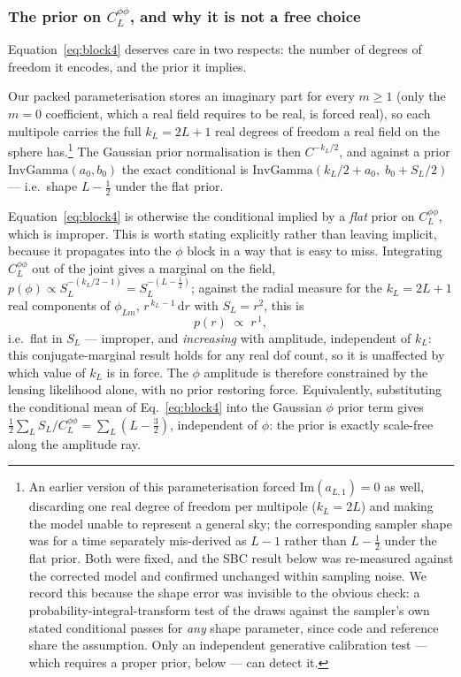 \documentclass[twocolumn,superscriptaddress,aps,prl,floatfix]{revtex4-2}
\newcommand{\clpp}{C_L^{\phi\phi}}
\begin{document}
\subsubsection*{The prior on \texorpdfstring{$\clpp$}{ClPhiPhi}, and why it is
not a free choice}
\label{sec:clpp-prior}

Equation~\eqref{eq:block4} deserves care in two respects: the number of degrees
of freedom it encodes, and the prior it implies.

Our packed parameterisation stores an imaginary part for every $m \ge 1$ (only
the $m=0$ coefficient, which a real field requires to be real, is forced real),
so each multipole carries the full $k_L = 2L+1$ real degrees of freedom a real
field on the sphere has.\footnote{An earlier version of this parameterisation
forced $\mathrm{Im}(a_{L,1}) = 0$ as well, discarding one real degree of
freedom per multipole ($k_L = 2L$) and making the model unable to represent a
general sky; the corresponding sampler shape was for a time separately
mis-derived as $L-1$ rather than $L-\tfrac12$ under the flat prior. Both were
fixed, and the SBC result below was re-measured against the corrected model
and confirmed unchanged within sampling noise. We record this because the
shape error was invisible to the obvious check: a probability-integral-transform
test of the draws against the sampler's own stated conditional passes for
\emph{any} shape parameter, since code and reference share the assumption.
Only an independent generative calibration test --- which requires a proper
prior, below --- can detect it.} The Gaussian prior normalisation is then
$C^{-k_L/2}$, and against a prior $\mathrm{InvGamma}(a_0, b_0)$ the exact
conditional is $\mathrm{InvGamma}(k_L/2 + a_0,\; b_0 + S_L/2)$ --- i.e.\ shape
$L-\tfrac12$ under the flat prior.

Equation~\eqref{eq:block4} is otherwise the conditional implied by a
\emph{flat} prior on $\clpp$, which is improper. This is worth stating explicitly rather than
leaving implicit, because it propagates into the $\phi$ block in a way that is
easy to miss. Integrating $\clpp$ out of the joint gives a marginal on the
field, $p(\phi) \propto S_L^{-(k_L/2 - 1)} = S_L^{-(L-\frac12)}$; against the radial
measure for the $k_L = 2L+1$ real components of $\phi_{Lm}$,
$r^{\,k_L - 1}\,\mathrm{d}r$ with $S_L = r^2$, this is
\begin{equation}
  p(r) \;\propto\; r^{\,1} ,
\end{equation}
i.e.\ flat in $S_L$ --- improper, and \emph{increasing} with amplitude,
independent of $k_L$: this conjugate-marginal result holds for any real dof
count, so it is unaffected by which value of $k_L$ is in force. The
$\phi$ amplitude is therefore constrained by the lensing likelihood alone, with
no prior restoring force. Equivalently, substituting the conditional mean of
Eq.~\eqref{eq:block4} into the Gaussian $\phi$ prior term gives
$\tfrac12 \sum_L S_L/\clpp = \sum_L (L - \tfrac32)$, independent of $\phi$: the
prior is exactly scale-free along the amplitude ray.
\end{document}
